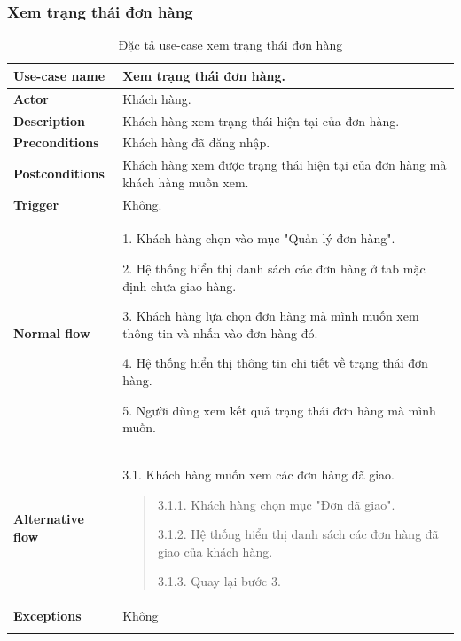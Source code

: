 \subsubsection{Xem trạng thái đơn hàng}
{
    \setlength\extrarowheight{6pt}
    \begin{longtable}{| p{} | p{} |}
        \hline
        \textbf{Use-case name}
         &
        Xem trạng thái đơn hàng.
        \\
        \hline
        \textbf{Actor}
         &
        Khách hàng.
        \\
        \hline
        \textbf{Description}
         &
        Khách hàng xem trạng thái hiện tại của đơn hàng.
        \\
        \hline
        \textbf{Preconditions}
         &
        Khách hàng đã đăng nhập.
        \\
        \hline
        \textbf{Postconditions}
         &
        Khách hàng xem được trạng thái hiện tại của đơn hàng mà khách hàng muốn xem.
        \\
        \hline
        \textbf{Trigger}
         &
        Không.
        \\
        \hline
        \begin{flushleft}
            \textbf{Normal flow}

        \end{flushleft}
         &
        1. Khách hàng chọn vào mục "Quản lý đơn hàng".

        2. Hệ thống hiển thị danh sách các đơn hàng ở tab mặc định chưa giao hàng.

        3. Khách hàng lựa chọn đơn hàng mà mình muốn xem thông tin và nhấn vào đơn hàng đó.

        4. Hệ thống hiển thị thông tin chi tiết về trạng thái đơn hàng.

        5. Người dùng xem kết quả trạng thái đơn hàng mà mình muốn.
        \\
        \hline
        \begin{flushleft}
            \textbf{Alternative flow}
        \end{flushleft}
         &
        3.1. Khách hàng muốn xem các đơn hàng đã giao.
        \begin{quote}
            3.1.1. Khách hàng chọn mục "Đơn đã giao".

            3.1.2. Hệ thống hiển thị danh sách các đơn hàng đã giao của khách hàng.

            3.1.3. Quay lại bước 3.
        \end{quote}
        \\
        \hline
        \textbf{Exceptions}
         &
        Không
        \\
        \hline
        \caption{Đặc tả use-case xem trạng thái đơn hàng}
    \end{longtable}
}


